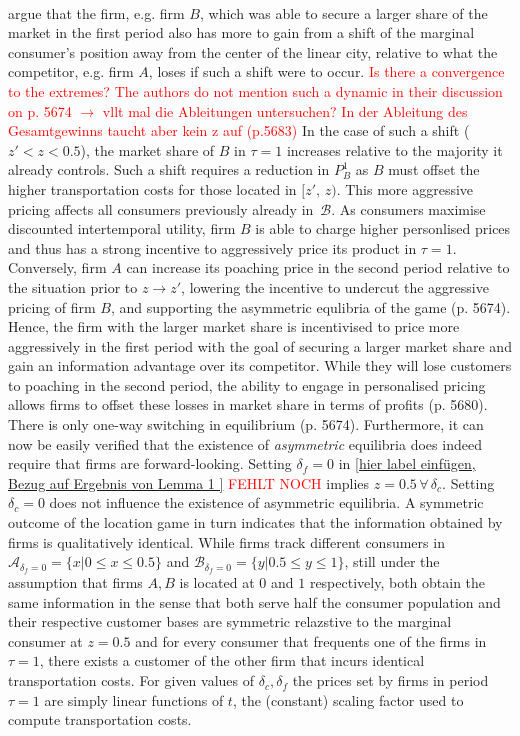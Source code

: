 \documentclass[a4paper, 11 pt, fleqn]{article}
\begin{document}
\\
\citet[p. 5674]{Choe.2018} argue that the firm, e.g. firm $B$, which was able to secure a larger share of the market in the first period also has more to gain from
a shift of the marginal consumer's position away from the center of the linear city, relative to what the competitor, e.g. firm $A$, loses if
such a shift were to occur. \textcolor{red}{Is there a convergence to the extremes? The authors do not mention such a dynamic in their discussion on p. 5674 $\to$ vllt mal die Ableitungen untersuchen? In der Ableitung des Gesamtgewinns taucht aber kein z auf (p.5683)} 
In the case of such a shift ($z' < z < 0.5$), the market share of $B$ in $\tau = 1$ increases relative to the majority it already controls.
Such a shift requires a reduction in $P^1_B$ as $B$ must offset the higher transportation costs for those located in $[z',\,z)$. This more aggressive
pricing affects all consumers previously already in~$\mathscr{B}$. As consumers maximise discounted intertemporal utility, firm $B$ is able to
charge higher personlised prices and thus has a strong incentive to aggressively price its product in $\tau = 1$. 
Conversely, firm $A$ can increase its poaching price in the second period relative to the situation prior to $z\to z'$, lowering the incentive 
to undercut the aggressive pricing of firm $B$, and supporting the asymmetric equlibria of the game (p. 5674). \\
Hence, the firm with the larger market share is incentivised to price more aggressively in the first period with the goal of securing a larger
market share and gain an information advantage over its competitor. While they will lose customers to poaching in the second period,
the ability to engage in personalised pricing allows firms to offset these losses in market share in terms of profits (p. 5680).
There is only one-way switching in equilibrium (p. 5674).
%
Furthermore, it can now be easily verified that the existence of \textit{asymmetric} equilibria does indeed
require that firms are forward-looking. Setting $\delta_f = 0$ in \eqref{hier label einfügen, Bezug auf Ergebnis von Lemma 1 } \textcolor{red}{FEHLT NOCH} implies $z = 0.5\, \forall\, \delta_c$. Setting $\delta_c = 0$ does not influence the
existence of asymmetric equilibria. A symmetric outcome of the location game in turn indicates that the information obtained by firms is qualitatively
identical. While firms track different consumers in $\mathscr{A}_{\delta_f = 0} = \{x | 0 \leq x \leq 0.5\}$ and $\mathscr{B}_{\delta_f = 0} = \{y | 0.5 \leq y \leq 1\}$, still under the
assumption that firms $A,B$ is located at $0$ and $1$ respectively, both obtain the same information in the sense that both serve half the consumer 
population and their respective customer bases are symmetric relazstive to the marginal consumer at $z = 0.5$ and for every consumer that frequents one
of the firms in $\tau = 1$, there exists a customer of the other firm that incurs identical transportation costs.
For given values of $\delta_c, \delta_f$ the prices set by firms in period $\tau = 1$ are simply linear functions of $t$,
the (constant) scaling factor used to compute transportation costs.
\end{document}
